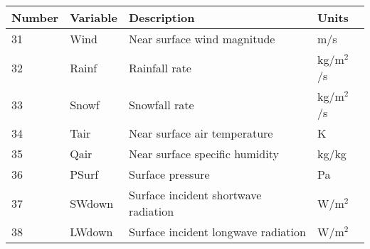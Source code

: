 \begin{tabular}{|l|l|l|l|} \hline
Number & Variable & Description                     & Units         \\ \hline
31 & Wind   & Near surface wind magnitude           & m/s           \\ \hline
32 & Rainf  & Rainfall rate                         & kg/m$^2$/s    \\ \hline
33 & Snowf  & Snowfall rate                         & kg/m$^2$/s    \\ \hline
34 & Tair   & Near surface air temperature          & K             \\ \hline
35 & Qair   & Near surface specific humidity        & kg/kg         \\ \hline
36 & PSurf  & Surface pressure                      & Pa            \\ \hline
37 & SWdown & Surface incident shortwave radiation  & W/m$^2$       \\ \hline
38 & LWdown & Surface incident longwave radiation   & W/m$^2$       \\ \hline
\end{tabular}

\setlength{\extrarowheight}{0pt}

